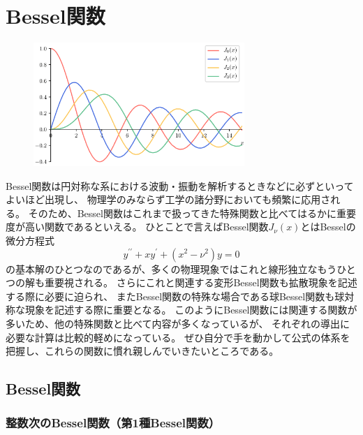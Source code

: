 \documentclass[../main/main]{subfiles}
\begin{document}
\chapter{Bessel関数}


\vspace{-180pt}
\begin{figure}[H]
  \begin{flushright}
    \includegraphics[width=80mm]{../fig/bessel/bessel_title.png}
  \end{flushright}
\end{figure}
\small

\vspace{-12pt}
\footnotesize
Bessel関数は円対称な系における波動・振動を解析するときなどに必ずといってよいほど出現し、
物理学のみならず工学の諸分野においても頻繁に応用される。
そのため、Bessel関数はこれまで扱ってきた特殊関数と比べてはるかに重要度が高い関数であるといえる。
ひとことで言えばBessel関数$J_\nu(x)$とはBesselの微分方程式
\begin{equation*}
  y^{\prime\prime} + x y^\prime + (x^2 - \nu^2)y = 0
\end{equation*}
の基本解のひとつなのであるが、多くの物理現象ではこれと線形独立なもうひとつの解も重要視される。
さらにこれと関連する変形Bessel関数も拡散現象を記述する際に必要に迫られ、
またBessel関数の特殊な場合である球Bessel関数も球対称な現象を記述する際に重要となる。
このようにBessel関数には関連する関数が多いため、他の特殊関数と比べて内容が多くなっているが、
それぞれの導出に必要な計算は比較的軽めになっている。
ぜひ自分で手を動かして公式の体系を把握し、これらの関数に慣れ親しんでいきたいところである。

\small

\section{Bessel関数}
\subsection{整数次のBessel関数（第1種Bessel関数）}
\end{document}
